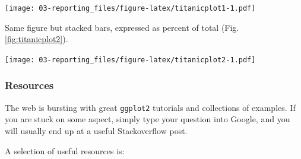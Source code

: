 \documentclass[]{book}
\newenvironment{Shaded}{\begin{snugshade}}{\end{snugshade}}
\newcommand{\CommentTok}[1]{\textcolor[rgb]{0.56,0.35,0.01}{\textit{#1}}}
\newcommand{\DataTypeTok}[1]{\textcolor[rgb]{0.13,0.29,0.53}{#1}}
\newcommand{\KeywordTok}[1]{\textcolor[rgb]{0.13,0.29,0.53}{\textbf{#1}}}
\newcommand{\NormalTok}[1]{#1}
\newcommand{\OperatorTok}[1]{\textcolor[rgb]{0.81,0.36,0.00}{\textbf{#1}}}
\newcommand{\StringTok}[1]{\textcolor[rgb]{0.31,0.60,0.02}{#1}}
\begin{document}
\texttt{[image: 03-reporting\_files/figure-latex/titanicplot1-1.pdf]}

Same figure but stacked bars, expressed as percent of total (Fig. \ref{fig:titanicplot2}).

\begin{Shaded}
\end{Shaded}

\texttt{[image: 03-reporting\_files/figure-latex/titanicplot2-1.pdf]}

\hypertarget{ggplotresources}{%
\subsubsection{Resources}\label{ggplotresources}}

The web is bursting with great \texttt{ggplot2} tutorials and collections of examples. If you are stuck on some aspect, simply type your question into Google, and you will usually end up at a useful Stackoverflow post.

A selection of useful resources is:
\end{document}
